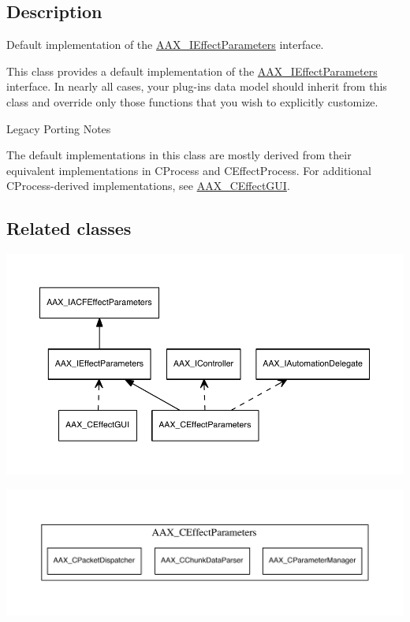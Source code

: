 \subsection{Description}
Default implementation of the \hyperlink{a00099}{A\+A\+X\+\_\+\+I\+Effect\+Parameters} interface. 

This class provides a default implementation of the \hyperlink{a00099}{A\+A\+X\+\_\+\+I\+Effect\+Parameters} interface. In nearly all cases, your plug-\/in\textquotesingle{}s data model should inherit from this class and override only those functions that you wish to explicitly customize.

\begin{DoxyRefDesc}{Legacy Porting Notes}
\item[\hyperlink{a00384__porting_notes000006}{Legacy Porting Notes}]The default implementations in this class are mostly derived from their equivalent implementations in C\+Process and C\+Effect\+Process. For additional C\+Process-\/derived implementations, see \hyperlink{a00017}{A\+A\+X\+\_\+\+C\+Effect\+G\+U\+I}.\end{DoxyRefDesc}
\hypertarget{a00018_AAX_CEffectParameters_relclass}{}\subsection{Related classes}\label{a00018_AAX_CEffectParameters_relclass}

\begin{DoxyImage}
\includegraphics[width=\textwidth,height=\textheight/2,keepaspectratio=true]{dot_aax_ieffectparams_related}
\caption{Classes related to A\+A\+X\+\_\+\+I\+Effect\+Parameters by inheritance or composition}
\end{DoxyImage}
 
\begin{DoxyImage}
\includegraphics[width=\textwidth,height=\textheight/2,keepaspectratio=true]{dot_aax_ieffectparams_contained}
\caption{Classes owned as member objects of A\+A\+X\+\_\+\+C\+Effect\+Parameters}
\end{DoxyImage}
